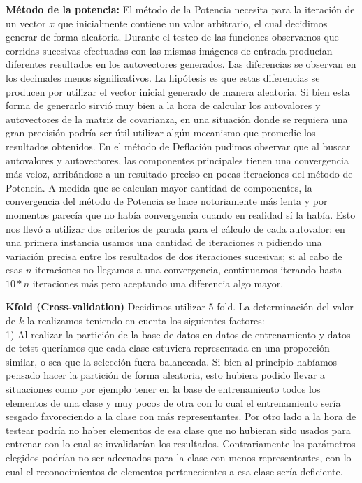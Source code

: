 \textbf{Método de la potencia:} El método de la Potencia necesita para la iteración de un vector $x$ que inicialmente contiene un valor arbitrario, el cual decidimos generar de forma aleatoria. Durante el testeo de las funciones observamos que corridas sucesivas efectuadas con las mismas imágenes de entrada producían diferentes resultados en los autovectores generados. Las diferencias se observan en los decimales menos significativos. La hipótesis es que estas diferencias se producen por utilizar el vector inicial generado de manera aleatoria. Si bien esta forma de generarlo sirvió muy bien a la hora de calcular los autovalores y autovectores de la matriz de covarianza, en una situación donde se requiera una gran precisión podría ser útil utilizar algún mecanismo que promedie los resultados obtenidos.
En el método de Deflación pudimos observar que al buscar autovalores y autovectores, las componentes principales tienen una convergencia más veloz, arribándose a un resultado preciso en pocas iteraciones del método de Potencia. A medida que se calculan mayor cantidad de componentes, la convergencia del método de Potencia se hace notoriamente más lenta y por momentos parecía que no había convergencia cuando en realidad sí la había. Esto nos llevó a utilizar dos criterios de parada para el cálculo de cada autovalor: en una primera instancia usamos una cantidad de iteraciones $n$ pidiendo una variación precisa entre los resultados de dos iteraciones sucesivas; si al cabo de esas $n$ iteraciones no llegamos a una convergencia, continuamos iterando hasta $10*n$ iteraciones más pero aceptando una diferencia algo mayor.


\textbf{Kfold (Cross-validation)}
Decidimos utilizar 5-fold.
La determinación del valor de $k$ la realizamos teniendo en cuenta los siguientes factores:
\\1) Al realizar la partición de la base de datos en datos de entrenamiento y datos de tetst queríamos que cada clase estuviera representada en una proporción similar, o sea que la selección fuera balanceada. Si bien al principio habíamos pensado hacer la partición de forma aleatoria, esto hubiera podido llevar a situaciones como por ejemplo tener en la base de entrenamiento todos los elementos de una clase y muy pocos de otra con lo cual el entrenamiento sería sesgado favoreciendo a la clase con más representantes. Por otro lado a la hora de testear podría no haber elementos de esa clase que no hubieran sido usados para entrenar con lo cual se invalidarían los resultados. Contrariamente los parámetros elegidos podrían no ser adecuados para la clase con menos representantes, con lo cual el reconocimientos de elementos pertenecientes a esa clase sería deficiente.

